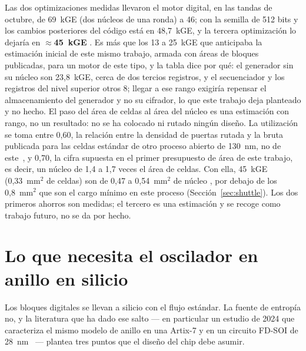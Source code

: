 Las dos optimizaciones medidas llevaron el motor digital, en las tandas
de octubre, de 69~kGE (dos núcleos de una ronda) a 46; con la semilla de
512 bits y los cambios posteriores del código está en 48,7~kGE, y la
tercera optimización lo dejaría en
\textbf{$\approx$45~kGE} \est{}. Es más que los 13 a 25~kGE que
anticipaba la estimación inicial de este mismo trabajo, armada con áreas
de bloques publicadas, para un motor de este tipo, y la tabla dice por
qué: el
generador sin su núcleo son 23,8~kGE, cerca de dos tercios registros, y
el secuenciador y los registros del nivel superior otros 8; llegar a ese
rango exigiría repensar el almacenamiento del generador y no su
cifrador, lo que este trabajo deja planteado y no hecho.
El paso del área de celdas al área del núcleo es una estimación con
rango, no un resultado: no se ha colocado ni rutado ningún diseño. La
utilización se toma entre 0,60, la relación entre la densidad de puertas
rutada y la bruta publicada para las celdas estándar de otro proceso
abierto de 130~nm, no de este~\cite{skywater_pdk_cells}, y 0,70, la
cifra supuesta en el primer presupuesto de área de este trabajo, es
decir, un núcleo de 1,4 a 1,7 veces el área de celdas. Con ella, 45~kGE
(0,33~mm$^2$ de celdas) son de 0,47 a 0,54~mm$^2$ de núcleo \est{}, por
debajo de los 0,8~mm$^2$ que son el cargo mínimo en este proceso
(Sección~\ref{sec:shuttle}). Los dos primeros
ahorros son medidas; el tercero es una estimación y se recoge como
trabajo futuro, no se da por hecho.

\section{Lo que necesita el oscilador en anillo en silicio}
\label{sec:ro_silicon}

Los bloques digitales se llevan a silicio con el flujo estándar. La fuente
de entropía no, y la literatura que ha dado ese salto --- en particular un
estudio de 2024 que caracteriza el mismo modelo de anillo en una Artix-7 y
en un circuito FD-SOI de 28~nm~\cite{benea_2024_flicker} --- plantea tres
puntos que el diseño del chip debe asumir.

